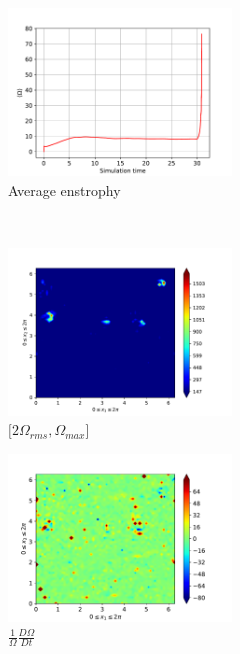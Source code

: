\begin{figure}[H]
    \begin{subfigure}[H]{0.45\textwidth}
        \includegraphics[height=1.75in]{media/run-cds-65/enst-average1420}
        \caption{Average enstrophy}
    \end{subfigure}
    ~
    \begin{subfigure}[H]{0.45\textwidth}
        \includegraphics[height=1.75in]{media/run-cds-65/enst-2-1420}
        \caption{$[2\Omega_{rms}, \Omega_{max} $] }
    \end{subfigure}
    \newline
    \begin{subfigure}[H]{0.45\textwidth}
        \includegraphics[height=1.75in]{media/run-cds-65/enst-1420}
        \caption{$\frac{1}{\Omega} \frac{D \Omega}{Dt}$}
    \end{subfigure}
    ~
    \begin{subfigure}{0.45\textwidth}

\end{subfigure}
\end{figure}
